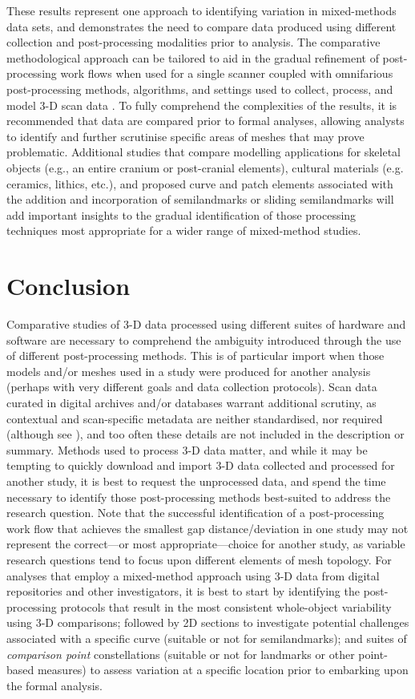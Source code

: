 \documentclass[review]{elsarticle}
\begin{document}
These results represent one approach to identifying variation in mixed-methods data sets, and demonstrates the need to compare data produced using different collection and post-processing modalities prior to analysis. The comparative methodological approach can be tailored to aid in the gradual refinement of post-processing work flows when used for a single scanner coupled with omnifarious post-processing methods, algorithms, and settings used to collect, process, and model 3-D scan data \citep[22-23 and Figure 2]{RN11473}. To fully comprehend the complexities of the results, it is recommended that data are compared prior to formal analyses, allowing analysts to identify and further scrutinise specific areas of meshes that may prove problematic. Additional studies that compare modelling applications for skeletal objects (e.g., an entire cranium or post-cranial elements), cultural materials (e.g. ceramics, lithics, etc.), and proposed curve and patch elements associated with the addition and incorporation of semilandmarks or sliding semilandmarks will add important insights to the gradual identification of those processing techniques most appropriate for a wider range of mixed-method studies.

\section*{Conclusion}

Comparative studies of 3-D data processed using different suites of hardware and software are necessary to comprehend the ambiguity introduced through the use of different post-processing methods. This is of particular import when those models and/or meshes used in a study were produced for another analysis (perhaps with very different goals and data collection protocols). Scan data curated in digital archives and/or databases warrant additional scrutiny, as contextual and scan-specific metadata are neither standardised, nor required (although see \citet{RN5932,RN11507}), and too often these details are not included in the description or summary. Methods used to process 3-D data matter, and while it may be tempting to quickly download and import 3-D data collected and processed for another study, it is best to request the unprocessed data, and spend the time necessary to identify those post-processing methods best-suited to address the research question. Note that the successful identification of a post-processing work flow that achieves the smallest gap distance/deviation in one study may not represent the correct---or most appropriate---choice for another study, as variable research questions tend to focus upon different elements of mesh topology. For analyses that employ a mixed-method approach using 3-D data from digital repositories and other investigators, it is best to start by identifying the post-processing protocols that result in the most consistent whole-object variability using 3-D comparisons; followed by 2D sections to investigate potential challenges associated with a specific curve (suitable or not for semilandmarks); and suites of \textit{comparison point} constellations (suitable or not for landmarks or other point-based measures) to assess variation at a specific location prior to embarking upon the formal analysis.
\end{document}
